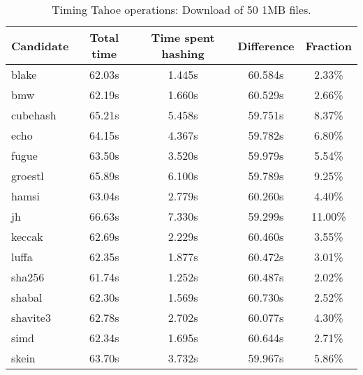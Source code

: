 \begin{table}[h]
  \centering
  \begin{tabular}{ | l | c | c | c | c | }
    \hline
    Candidate & Total time & Time spent hashing & Difference & Fraction \\ \hline
    blake & 62.03s & 1.445s & 60.584s & 2.33\% \\ \hline
    bmw & 62.19s & 1.660s & 60.529s & 2.66\% \\ \hline
    cubehash & 65.21s & 5.458s & 59.751s & 8.37\% \\ \hline
    echo & 64.15s & 4.367s & 59.782s & 6.80\% \\ \hline
    fugue & 63.50s & 3.520s & 59.979s & 5.54\% \\ \hline
    groestl & 65.89s & 6.100s & 59.789s & 9.25\% \\ \hline
    hamsi & 63.04s & 2.779s & 60.260s & 4.40\% \\ \hline
    jh & 66.63s & 7.330s & 59.299s & 11.00\% \\ \hline
    keccak & 62.69s & 2.229s & 60.460s & 3.55\% \\ \hline
    luffa & 62.35s & 1.877s & 60.472s & 3.01\% \\ \hline
    sha256 & 61.74s & 1.252s & 60.487s & 2.02\% \\ \hline
    shabal & 62.30s & 1.569s & 60.730s & 2.52\% \\ \hline
    shavite3 & 62.78s & 2.702s & 60.077s & 4.30\% \\ \hline
    simd & 62.34s & 1.695s & 60.644s & 2.71\% \\ \hline
    skein & 63.70s & 3.732s & 59.967s & 5.86\% \\ \hline
  \end{tabular}
  \caption{Timing Tahoe operations: Download of 50 1MB files.}
  \label{tbl:hashingtimes:get1mb}
\end{table}
